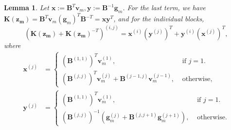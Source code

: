 \documentclass[a4paper, 11pt, oneside]{scrartcl}
\theoremstyle{break}
\newtheorem{lemma}{Lemma}[section]
\newcommand{\matr}[1]{\boldsymbol{#1}}
\numberwithin{equation}{section}
\begin{document}
				\begin{lemma}
					Let $\matr{x} := \matr{B}^T \matr{v}_m, \matr{y} := \matr{B}^{-1} \matr{g}_m$.
					For the last term, we have $\matr{K(\matr{z_m})} = \matr{B}^T \matr{v}_m (\matr{g}_m)^T \matr{B}^{-T} = \matr{x} \matr{y}^T$, and for the individual blocks,
					\begin{equation}
						\left( \matr{K(z_m)} + \matr{K(z_m)}^{-T} \right)^{(i, j)} = \matr{x}^{(i)} (\matr{y}^{(j)})^T + \matr{y}^{(i)} (\matr{x}^{(j)})^T,
					\end{equation}
					where 
					\begin{align}
						\matr{x}^{(j)} &= 
						\begin{cases}
							\left( \matr{B}^{(1, 1)} \right)^{T} \matr{v}_m^{(1)}, & \text{ if } j = 1. \\
							\left( \matr{B}^{(j, j)} \right)^{T} \matr{v}_m^{(j)} + \matr{B}^{(j-1, j)} \matr{v}_m^{(j-1)}, & \text{ otherwise},
						\end{cases} \\
						\matr{y}^{(j)} &= 
						\begin{cases}
							\left( \matr{B}^{(1, 1)} \right)^{T} \matr{v}_m^{(1)}, & \text{ if } j = 1. \\
							\left( \matr{B}^{(j, j)} \right)^{-1} \left( \matr{g}_m^{(j)} + \matr{B}^{(j, j+1)} \matr{g}_m^{(j+1)} \right), & \text{ otherwise}.
						\end{cases}
					\end{align}
				\end{lemma}
\end{document}
